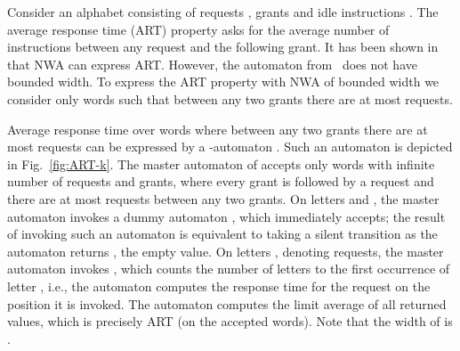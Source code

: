 \documentclass{lmcs}
\begin{document}
\begin{exa}\label{ex:NWA}
Consider an alphabet  consisting of requests , grants  and idle instructions .
The average response time (ART) property asks for the average number of instructions between
any request and the following grant. It has been shown in~\cite{nested} that NWA can express ART\@.
However, the automaton from~\cite{nested} does not have bounded width.
To express the ART property with NWA of bounded width we consider only words such that between any two grants there are at most  requests.

Average response time over words where between any two grants there are at most  requests can be expressed by a -automaton
. Such an automaton  is depicted in Fig.~\ref{fig:ART-k}.
The master automaton of  accepts only words with  infinite number of requests and grants, where every grant is followed by a request and
there are at most  requests between any two grants.
On letters  and , the master automaton invokes a dummy automaton , which immediately accepts;
the result of invoking such an automaton is equivalent to taking a silent transition as
the automaton  returns , the empty value.
On letters , denoting requests, the master automaton invokes , which
counts the number of letters to the first occurrence of letter , i.e.,
the automaton  computes the response time for the request on the position it is invoked.
The automaton  computes the limit average of all returned values, which is precisely
ART (on the accepted words).
Note that the width of  is .


\begin{figure}
\centering
{}
\end{figure}
\end{exa}
\end{document}
